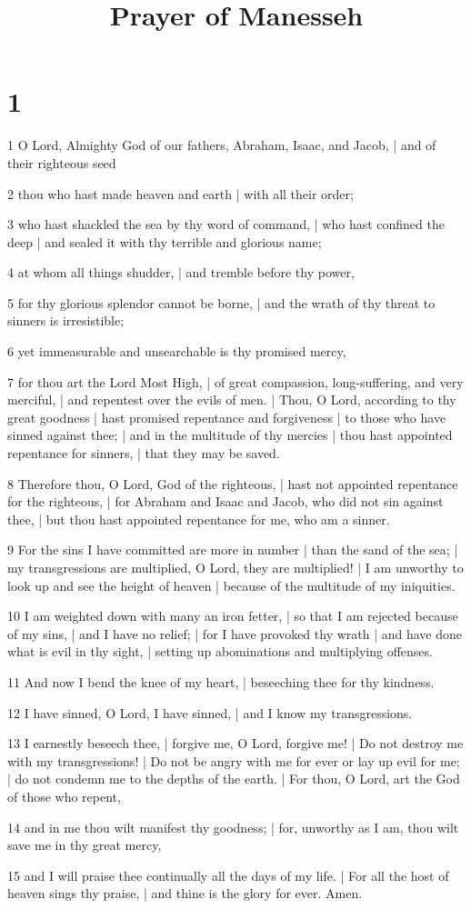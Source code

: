 

\title{Prayer of Manesseh}

\chapter{1}

\par 1 O Lord, Almighty God of our fathers, Abraham, Isaac, and Jacob, | and of their righteous seed
\par 2 thou who hast made heaven and earth | with all their order;
\par 3 who hast shackled the sea by thy word of command, | who hast confined the deep | and sealed it with thy terrible and glorious name;
\par 4 at whom all things shudder, | and tremble before thy power,
\par 5 for thy glorious splendor cannot be borne, | and the wrath of thy threat to sinners is irresistible;
\par 6 yet immeasurable and unsearchable is thy promised mercy,
\par 7 for thou art the Lord Most High, | of great compassion, long-suffering, and very merciful, | and repentest over the evils of men. | Thou, O Lord, according to thy great goodness | hast promised repentance and forgiveness | to those who have sinned against thee; | and in the multitude of thy mercies | thou hast appointed repentance for sinners, | that they may be saved.
\par 8 Therefore thou, O Lord, God of the righteous, | hast not appointed repentance for the righteous, | for Abraham and Isaac and Jacob, who did not sin against thee, | but thou hast appointed repentance for me, who am a sinner.
\par 9 For the sins I have committed are more in number | than the sand of the sea; | my transgressions are multiplied, O Lord, they are multiplied! | I am unworthy to look up and see the height of heaven | because of the multitude of my iniquities.
\par 10 I am weighted down with many an iron fetter, | so that I am rejected because of my sins, | and I have no relief; | for I have provoked thy wrath | and have done what is evil in thy sight, | setting up abominations and multiplying offenses.
\par 11 And now I bend the knee of my heart, | beseeching thee for thy kindness.
\par 12 I have sinned, O Lord, I have sinned, | and I know my transgressions.
\par 13 I earnestly beseech thee, | forgive me, O Lord, forgive me! | Do not destroy me with my transgressions! | Do not be angry with me for ever or lay up evil for me; | do not condemn me to the depths of the earth. | For thou, O Lord, art the God of those who repent,
\par 14 and in me thou wilt manifest thy goodness; | for, unworthy as I am, thou wilt save me in thy great mercy,
\par 15 and I will praise thee continually all the days of my life. | For all the host of heaven sings thy praise, | and thine is the glory for ever. Amen.

